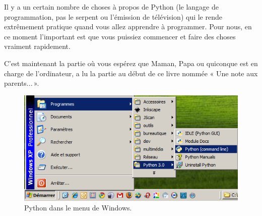 Il y a un certain nombre de choses à propos de Python (le langage de programmation, pas le serpent ou l'émission de télévision) qui le rende extrêmement pratique quand vous allez apprendre à programmer. Pour nous, en ce moment l'important est que vous puissiez commencer et faire des choses vraiment rapidement.

C'est maintenant la partie où vous espérez que Maman, Papa ou quiconque est en charge de l'ordinateur, a lu la partie au début de ce livre nommée « Une note aux parents... ».

\begin{figure}[!ht]
\capstart
\centering
\includegraphics[scale=0.6]{images/startmenu}
\caption{Python dans le menu de Windows.}\label{fig:startmenu}
\end{figure}

